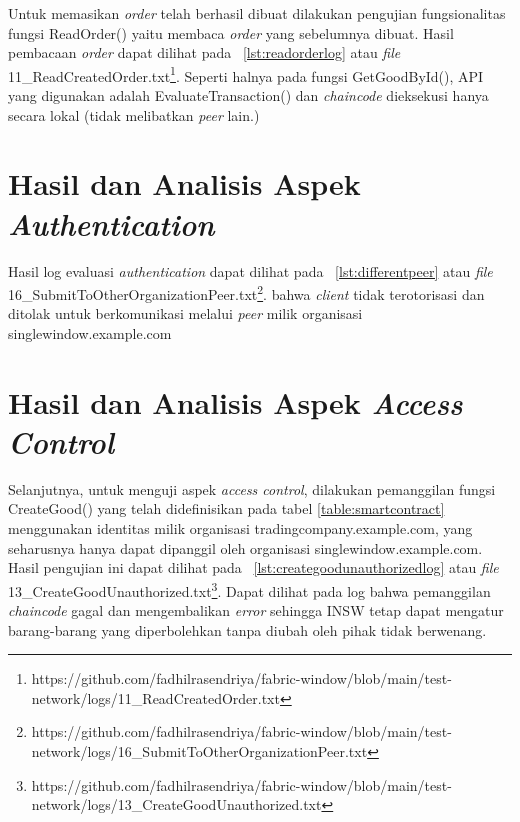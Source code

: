 

Untuk memasikan \textit{order} telah berhasil dibuat dilakukan pengujian fungsionalitas fungsi ReadOrder() yaitu membaca \textit{order} yang sebelumnya dibuat. Hasil pembacaan \textit{order} dapat dilihat pada \lst~\ref{lst:readorderlog} atau \textit{file} 11\_ReadCreatedOrder.txt\footnote{https://github.com/fadhilrasendriya/fabric-window/blob/main/test-network/logs/11\_ReadCreatedOrder.txt}. Seperti halnya pada fungsi GetGoodById(), API yang digunakan adalah EvaluateTransaction() dan \textit{chaincode} dieksekusi hanya secara lokal (tidak melibatkan \textit{peer} lain.)



\section{Hasil dan Analisis Aspek \textit{Authentication}}
Hasil log evaluasi \textit{authentication} dapat dilihat pada \lst~\ref{lst:differentpeer} atau \textit{file} 16\_SubmitToOtherOrganizationPeer.txt\footnote{https://github.com/fadhilrasendriya/fabric-window/blob/main/test-network/logs/16\_SubmitToOtherOrganizationPeer.txt}. bahwa \textit{client} tidak terotorisasi dan ditolak untuk berkomunikasi melalui \textit{peer} milik organisasi singlewindow.example.com



\section{Hasil dan Analisis Aspek \textit{Access Control}}
Selanjutnya, untuk menguji aspek \textit{access control}, dilakukan pemanggilan fungsi CreateGood() yang telah didefinisikan pada tabel \ref{table:smartcontract} menggunakan identitas milik organisasi tradingcompany.example.com, yang seharusnya hanya dapat dipanggil oleh organisasi singlewindow.example.com. Hasil pengujian ini dapat dilihat pada \lst~\ref{lst:creategoodunauthorizedlog} atau \textit{file} 13\_CreateGoodUnauthorized.txt\footnote{https://github.com/fadhilrasendriya/fabric-window/blob/main/test-network/logs/13\_CreateGoodUnauthorized.txt}. Dapat dilihat pada log bahwa pemanggilan \textit{chaincode} gagal dan mengembalikan \textit{error} sehingga INSW tetap dapat mengatur barang-barang yang diperbolehkan tanpa diubah oleh pihak tidak berwenang.

